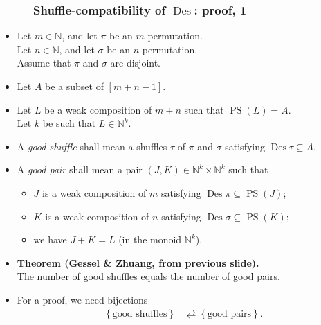 \documentclass{beamer}
\newcommand{\NN}{{\mathbb N}}
\newcommand{\Des}{\operatorname{Des}}
\newcommand{\PS}{\operatorname{PS}}
\newcommand{\fti}[1]{\frametitle{\ \ \ \ \ #1}}
\newcommand{\set}[1]{\left\{ #1 \right\}}
\newcommand{\tup}[1]{\left( #1 \right)}
\newcommand{\ive}[1]{\left[ #1 \right]}
\newcommand{\defn}[1]{{\color{darkred}\emph{#1}}} %
\theoremstyle{plain}
\begin{document}
\begin{frame}
\fti{Shuffle-compatibility of $\Des$: proof, 1}

\begin{itemize}

\item Let $m \in \NN$, and let $\pi$ be an $m$-permutation. \\
      Let $n \in \NN$, and let $\sigma$ be an $n$-permutation. \\
      Assume that $\pi$ and $\sigma$ are disjoint.

\item Let $A$ be a subset of $\ive{m+n-1}$. \\

\item Let $L$ be a weak composition of $m+n$ such that
      $\PS\tup{L} = A$.
      \\ Let $k$ be such that $L \in \NN^k$.

\pause

\item A \defn{good shuffle} shall mean a
      shuffles $\tau$ of $\pi$ and $\sigma$ satisfying
      $\Des \tau \subseteq A$.

\item A \defn{good pair} shall mean a pair
      $\tup{J, K} \in \NN^k \times \NN^k$ such that
      \begin{itemize}
      \item $J$ is a weak composition of $m$ satisfying $\Des \pi \subseteq \PS \tup{J}$;
      \item $K$ is a weak composition of $n$ satisfying $\Des \sigma \subseteq \PS \tup{K}$;
      \item we have $J + K = L$ (in the monoid $\NN^k$).
      \end{itemize}

\item \textbf{Theorem (Gessel \& Zhuang, from previous slide).} \\
      The number of good shuffles equals the number of good pairs.

\pause

\item For a proof, we need bijections
      \begin{align*}
               \set{\text{good shuffles}}
               &\rightleftarrows
               \set{\text{good pairs}} .
      \end{align*}

\end{itemize}

\vspace{10cm}

\end{frame}
\end{document}

